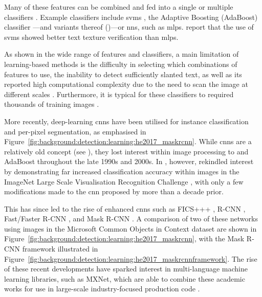 Many of these features can be combined and fed into a single or multiple classifiers \citep{Pan:2010cj, Hanif:2008un, Hanif:2009tm, Gllavata:2004vq, Ye:2005wu, Wang:2009il, Tu:2003tg}. Example classifiers include \glspl{svm} \citep{Cortes:1995wa,Burges:1998wd,Vapnik:1999vu}, the Adaptive Boosting (AdaBoost) classifier \citep{Freund:1996uc}---and variants thereof (\citep{Friedman:2000jg,Hanif:2009tm,Sochman:2005dn})---or \glspl{nn}, such as \glspl{mlp}. \citet{Chen:2004tja} report that the use of \glspl{svm} showed better text texture verification than \glspl{mlp}. 

As shown in the wide range of features and classifiers, a main limitation of learning-based methods is the difficulty in selecting which combinations of features to use, the inability to detect sufficiently slanted text, as well as its reported high computational complexity due to the need to scan the image at different scales \citep{Li:2012wd, Epshtein:2010tj}. Furthermore, it is typical for these classifiers to required thousands of training images \cite{Chen:2004ux}.

More recently, deep-learning \glspl{cnn} have been utilised for instance classification and per-pixel segmentation, as emphasised in Figure~\ref{fig:background:detection:learning:he2017_maskrcnn}. While \glspl{cnn} are a relatively old concept (see \citet{Lecun:1998hy}), they lost interest within image processing to  and AdaBoost throughout the late 1990s and 2000s. In \citeyear{Krizhevsky:2012wl}, however, \citet{Krizhevsky:2012wl} rekindled interest by demonstrating far increased classification accuracy within images in the ImageNet Large Scale Visualisation Recognition Challenge \citep{JiaDeng:2009dl}, with only a few modifications made to the \gls{cnn} proposed by \citeauthor{Lecun:1998hy} more than a decade prior. 

This has since led to the rise of enhanced \glspl{cnn} such as FICS+++ \citep{Li:2016uj}, R-CNN \citep{Girshick:2014jx}, Fast/Faster R-CNN \citep{Girshick:2015vr, Ren:2017ug}, and Mask R-CNN \citep{He:2017ud}. A comparison of two of these networks using images in the Microsoft Common Objects in Context \cite{Lin:2014vm} dataset are shown in Figure~\ref{fig:background:detection:learning:he2017_maskrcnn}, with the Mask R-CNN framework illustrated in Figure~\ref{fig:background:detection:learning:he2017_maskrcnnframework}. The rise of these recent developments have sparked interest in multi-language machine learning libraries, such as MXNet, which are able to combine these academic works for use in large-scale industry-focused production code \cite{Chen:2015vh}.

